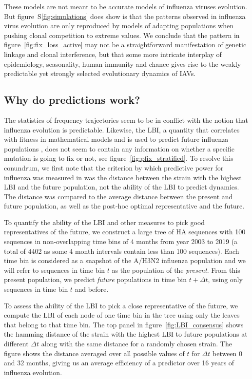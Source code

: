 \documentclass[reprint,amsmath,amssymb,superscriptaddress,showpacs,rmp]{revtex4-1}
\newcommand{\sref}[1]{S\ref{#1}}
\begin{document}
These models are not meant to be accurate models of influenza viruses evolution. 
But figure~\sref{fig:simulations} does show is that the patterns observed in influenza virus evolution are only reproduced by models of adapting populations when pushing clonal competition to extreme values.
We conclude that the pattern in figure~\ref{fig:fix_loss_active} may not be a straightforward manifestation of genetic linkage and clonal interference, but that some more intricate interplay of epidemiology, seasonality, human immunity and chance gives rise to the weakly predictable yet strongly selected evolutionary dynamics of IAVs.

\subsection*{Why do predictions work?}
The statistics of frequency trajectories seem to be in conflict with the notion that influenza evolution is predictable.
Likewise, the LBI, a quantity that correlates with fitness in mathematical models and is used to predict future influenza populations \citep{neher_predicting_2014}, does not seem to contain any information on whether a specific mutation is going to fix or not, see figure~\ref{fig:pfix_stratified}. 
To resolve this conundrum, we first note that the criterion by which predictive power for influenza was measured in \citep{neher_predicting_2014} was the distance between the strain with the highest LBI and the future population, not the ability of the LBI to predict dynamics.
The distance was compared to the average distance between the present and future population, as well as the post-hoc optimal representative and the future. 

To quantify the ability of the LBI and other measures to pick good representatives of the future, we construct a large tree of HA sequences with 100 sequences in non-overlapping time bins of 4 months from year 2003 to 2019 (a total of 4402 as some 4 month intervals contain less than 100 sequences).
Each time bin is considered as a snapshot of the A/H3N2 influenza population and we will refer to sequences in time bin $t$ as the population of the \emph{present}. 
From this present population, we predict \emph{future} populations in time bin $t+\Delta t$, using only sequences in time bin $t$ and before. 

To assess the ability of the LBI to pick a close representative of the future, we compute the LBI of each node of one time bin in the tree using only the leaves that belong to that time bin. 
The top panel in figure~\ref{fig:LBI_consensus} shows the hamming distance of the strain with the highest LBI to future populations at different $\Delta t$ along with the same distance for a randomly chosen strain. 
The figure shows the distance averaged over all possible values of $t$ for $\Delta t$ between $0$ and $32$ months, giving us an average efficiency of a predictor over 16 years of influenza evolution. 
\end{document}
